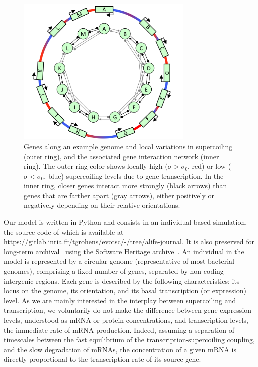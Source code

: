 \begin{figure}[H]
  \centering
  \includegraphics[width=0.75\textwidth]{alife/img/reseau.png}
  \caption[Hand-drawn genome and local interactions resulting from the TSC]{Genes along an example genome and local variations in supercoiling (outer ring), and the associated gene interaction network (inner ring).
  The outer ring color shows locally high ($\sigma > \sigma_0$, red) or low ($\sigma < \sigma_0$, blue) supercoiling levels due to gene transcription.
  In the inner ring, closer genes interact more strongly (black arrows) than genes that are farther apart (gray arrows), either positively or negatively depending on their relative orientations.}
  \label{fig:alife:network}
\end{figure}


Our model is written in Python and consists in an individual-based simulation, the source code of which is available at
\url{https://gitlab.inria.fr/tgrohens/evotsc/-/tree/alife-journal}.
It is also preserved for long-term archival~\citep{evotsc_swh} using the Software Heritage archive~\citep{dicosmo2020}.
An individual in the model is represented by a circular genome (representative of most bacterial genomes), comprising a fixed number of genes, separated by non-coding intergenic regions.
Each gene is described by the following characteristics: its locus on the genome, its orientation, and its basal transcription (or expression) level.
As we are mainly interested in the interplay between supercoiling and transcription, we voluntarily do not make the difference between gene expression levels, understood as mRNA or protein concentrations, and transcription levels, the immediate rate of mRNA
production.
Indeed, assuming a separation of timescales between the fast equilibrium of the transcription-supercoiling coupling, and the slow degradation of mRNAs, the concentration of a given mRNA is directly proportional to the transcription rate of its source gene.

